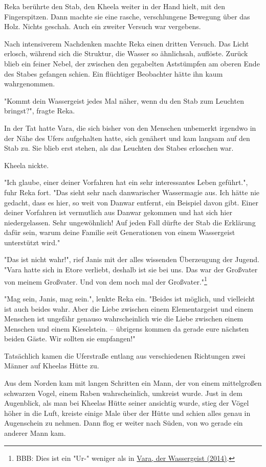 \documentclass[10pt, a4paper, oneside]{book}
\newcommand{\refstorytext}[1]{\hyperref[Storytext: #1]{#1}}
\begin{document}
\begin{multicols}{2}
Reka berührte den Stab, den Kheela weiter in der Hand hielt, mit den Fingerspitzen. Dann machte sie eine rasche, verschlungene Bewegung über das Holz. Nichts geschah. Auch ein zweiter Versuch war vergebens. 

Nach intensiverem Nachdenken machte Reka einen dritten Versuch. Das Licht erlosch, während sich die Struktur, die Wasser so ähnlichsah, auflöste. Zurück blieb ein feiner Nebel, der zwischen den gegabelten Aststümpfen am oberen Ende des Stabes gefangen schien. Ein flüchtiger Beobachter hätte ihn kaum wahrgenommen. 

"Kommt dein Wassergeist jedes Mal näher, wenn du den Stab zum Leuchten bringst?", fragte Reka. 

In der Tat hatte Vara, die sich bisher von den Menschen unbemerkt irgendwo in der Nähe des Ufers aufgehalten hatte, sich genähert und kam langsam auf den Stab zu. Sie blieb erst stehen, als das Leuchten des Stabes erloschen war. 

Kheela nickte. 

"Ich glaube, einer deiner Vorfahren hat ein sehr interessantes Leben geführt.", fuhr Reka fort. "Das sieht sehr nach danwarischer Wassermagie aus. Ich hätte nie gedacht, dass es hier, so weit von Danwar entfernt, ein Beispiel davon gibt. Einer deiner Vorfahren ist vermutlich aus Danwar gekommen und hat sich hier niedergelassen. Sehr ungewöhnlich! Auf jeden Fall dürfte der Stab die Erklärung dafür sein, warum deine Familie seit Generationen von einem Wassergeist unterstützt wird." 

"Das ist nicht wahr!", rief Janis mit der alles wissenden Überzeugung der Jugend. "Vara hatte sich in Etore verliebt, deshalb ist sie bei uns. Das war der Großvater von meinem Großvater. Und von dem noch mal der Großvater."\footnote{BBB: Dies ist ein "Ur-" weniger als in \refstorytext{Vara, der Wassergeist (2014)}.} 

"Mag sein, Janis, mag sein.", lenkte Reka ein. "Beides ist möglich, und vielleicht ist auch beides wahr. Aber die Liebe zwischen einem Elementargeist und einem Menschen ist ungefähr genauso wahrscheinlich wie die Liebe zwischen einem Menschen und einem Kieselstein. – übrigens kommen da gerade eure nächsten beiden Gäste. Wir sollten sie empfangen!" 

Tatsächlich kamen die Uferstraße entlang aus verschiedenen Richtungen zwei Männer auf Kheelas Hütte zu. 

Aus dem Norden kam mit langen Schritten ein Mann, der von einem mittelgroßen schwarzen Vogel, einem Raben wahrscheinlich, umkreist wurde. Just in dem Augenblick, als man bei Kheelas Hütte seiner ansichtig wurde, stieg der Vögel höher in die Luft, kreiste einige Male über der Hütte und schien alles genau in Augenschein zu nehmen. Dann flog er weiter nach Süden, von wo gerade ein anderer Mann kam. 


\end{multicols}
\end{document}
